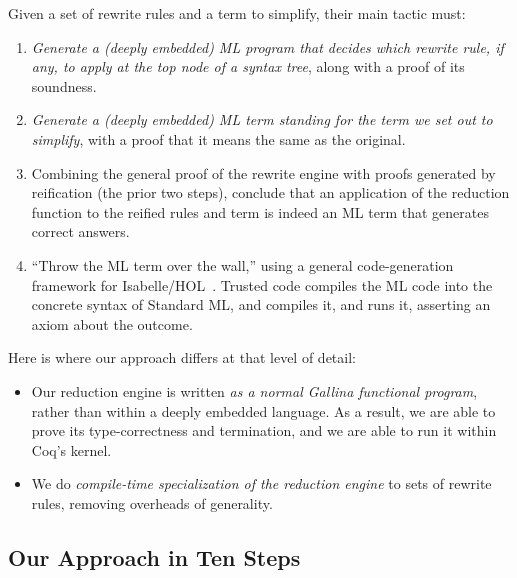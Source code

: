 \documentclass[a4paper,USenglish,cleveref,autoref,thm-restate]{lipics-v2021}
\begin{document}
Given a set of rewrite rules and a term to simplify, their main tactic must:
\begin{enumerate}
\item
  \emph{Generate a (deeply embedded) ML program that decides which rewrite rule, if any, to apply at the top node of a syntax tree}, along with a proof of its soundness.
\item
  \emph{Generate a (deeply embedded) ML term standing for the term we set out to simplify}, with a proof that it means the same as the original.
\item
  Combining the general proof of the rewrite engine with proofs generated by reification (the prior two steps), conclude that an application of the reduction function to the reified rules and term is indeed an ML term that generates correct answers.
\item
  ``Throw the ML term over the wall,'' using a general code-generation framework for Isabelle/HOL~\cite{CodeGen}.
  Trusted code compiles the ML code into the concrete syntax of Standard ML, and compiles it, and runs it, asserting an axiom about the outcome.
\end{enumerate}

Here is where our approach differs at that level of detail:
\begin{itemize}
\item
  Our reduction engine is written \emph{as a normal Gallina functional program}, rather than within a deeply embedded language.
  As a result, we are able to prove its type-correctness and termination, and we are able to run it within Coq's kernel.
\item
  We do \emph{compile-time specialization of the reduction engine} to sets of rewrite rules, removing overheads of generality.
\end{itemize}

\subsection{Our Approach in Ten Steps}\label{sec:nine-steps}
\end{document}
